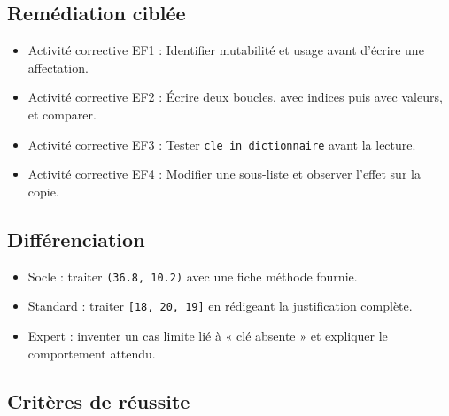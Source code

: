 \subsection{Remédiation ciblée}

\begin{itemize}
\tightlist
\item
  Activité corrective EF1 : Identifier mutabilité et usage avant
  d'écrire une affectation.
\item
  Activité corrective EF2 : Écrire deux boucles, avec indices puis avec
  valeurs, et comparer.
\item
  Activité corrective EF3 : Tester \texttt{cle\ in\ dictionnaire} avant
  la lecture.
\item
  Activité corrective EF4 : Modifier une sous-liste et observer l'effet
  sur la copie.
\end{itemize}

\subsection{Différenciation}

\begin{itemize}
\tightlist
\item
  Socle : traiter \texttt{(36.8,\ 10.2)} avec une fiche méthode fournie.
\item
  Standard : traiter \texttt{{[}18,\ 20,\ 19{]}} en rédigeant la
  justification complète.
\item
  Expert : inventer un cas limite lié à « clé absente » et expliquer le
  comportement attendu.
\end{itemize}

\subsection{Critères de réussite}

